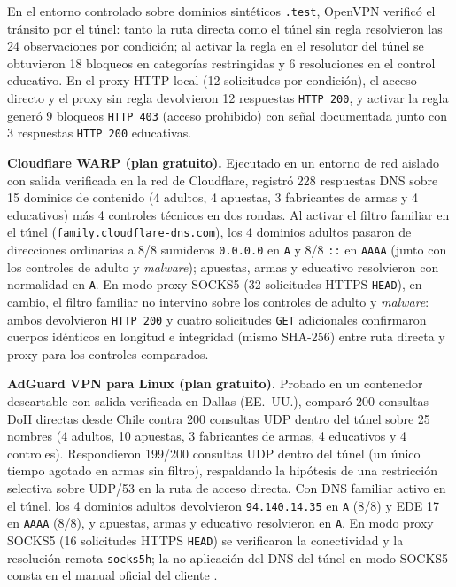 \documentclass[10pt,a4paper]{article}
\begin{document}
En el entorno controlado sobre dominios sintéticos \texttt{.test}, OpenVPN verificó el tránsito por el túnel: tanto la ruta directa como el túnel sin regla resolvieron las 24 observaciones por condición; al activar la regla en el resolutor del túnel se obtuvieron 18 bloqueos en categorías restringidas y 6 resoluciones en el control educativo. En el proxy HTTP local (12 solicitudes por condición), el acceso directo y el proxy sin regla devolvieron 12 respuestas \texttt{HTTP 200}, y activar la regla generó 9 bloqueos \texttt{HTTP 403} (acceso prohibido) con señal documentada junto con 3 respuestas \texttt{HTTP 200} educativas.

\textbf{Cloudflare WARP (plan gratuito).} Ejecutado en un entorno de red aislado con salida verificada en la red de Cloudflare, registró 228 respuestas DNS sobre 15 dominios de contenido (4 adultos, 4 apuestas, 3 fabricantes de armas y 4 educativos) más 4 controles técnicos en dos rondas. Al activar el filtro familiar en el túnel (\texttt{family.cloudflare-dns.com}), los 4 dominios adultos pasaron de direcciones ordinarias a 8/8 sumideros \texttt{0.0.0.0} en \texttt{A} y 8/8 \texttt{::} en \texttt{AAAA} (junto con los controles de adulto y \emph{malware}); apuestas, armas y educativo resolvieron con normalidad en \texttt{A}. En modo proxy SOCKS5 (32 solicitudes HTTPS \texttt{HEAD}), en cambio, el filtro familiar no intervino sobre los controles de adulto y \emph{malware}: ambos devolvieron \texttt{HTTP 200} y cuatro solicitudes \texttt{GET} adicionales confirmaron cuerpos idénticos en longitud e integridad (mismo SHA-256) entre ruta directa y proxy para los controles comparados.

\textbf{AdGuard VPN para Linux (plan gratuito).} Probado en un contenedor descartable con salida verificada en Dallas (EE.~UU.), comparó 200 consultas DoH directas desde Chile contra 200 consultas UDP dentro del túnel sobre 25 nombres (4 adultos, 10 apuestas, 3 fabricantes de armas, 4 educativos y 4 controles). Respondieron 199/200 consultas UDP dentro del túnel (un único tiempo agotado en armas sin filtro), respaldando la hipótesis de una restricción selectiva sobre UDP/53 en la ruta de acceso directa. Con DNS familiar activo en el túnel, los 4 dominios adultos devolvieron \texttt{94.140.14.35} en \texttt{A} (8/8) y EDE 17 en \texttt{AAAA} (8/8), y apuestas, armas y educativo resolvieron en \texttt{A}. En modo proxy SOCKS5 (16 solicitudes HTTPS \texttt{HEAD}) se verificaron la conectividad y la resolución remota \texttt{socks5h}; la no aplicación del DNS del túnel en modo SOCKS5 consta en el manual oficial del cliente \cite{adguardvpnlinux}.
\end{document}
